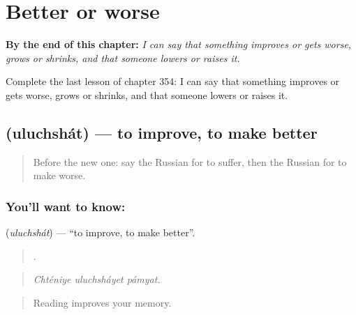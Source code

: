 
\chapter{Better or worse}
\label{ch:ru-better-or-worse}

\begin{chapteropening}
\textbf{By the end of this chapter:} \emph{I can say that something improves or gets worse, grows or shrinks, and that someone lowers or raises it.}

Complete the last lesson of chapter 354: I can say that something improves or gets worse, grows or shrinks, and that someone lowers or raises it.
\end{chapteropening}

\section[\texorpdfstring{\ru{улучшать} (uluchshát)}{улучшать (uluchshát)}]{ (uluchshát) — to improve, to make better}

\label{lesson:RU-C354-uluchshat}



\begin{quote}
Before the new one: say the Russian for to suffer, then the Russian for to make worse.
\end{quote}

\subsection*{You'll want to know: }
\textbf{} (\emph{uluchshát}) — \textquotedblleft{}to improve, to make better\textquotedblright{}.

\begin{quote}
  .
\end{quote}

\begin{quote}
\emph{Chténiye uluchsháyet pámyat.}
\end{quote}

\begin{quote}
Reading improves your memory.
\end{quote}

